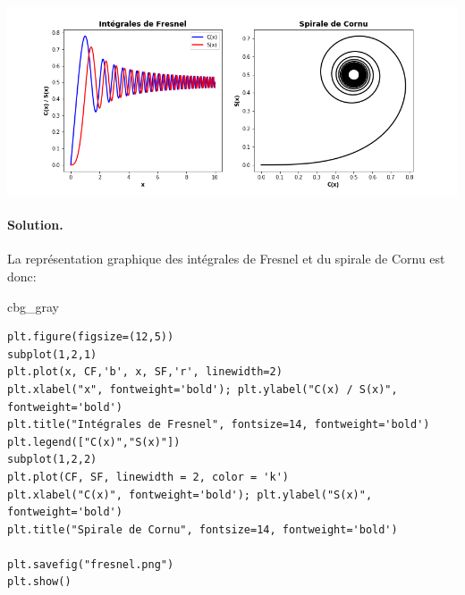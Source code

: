 \documentclass[%
oneside,                 %
final,                   %
10pt,french]{article}
\newenvironment{_cod_tight}[1]{
   \def\FrameCommand{\colorbox{#1}}
   \FrameRule0.6pt\MakeFramed {\FrameRestore}\vskip3mm}
   {\vskip0mm\endMakeFramed}
\newenvironment{cod}[1]{
\bgroup\rmfamily
\fboxsep=0mm\relax
\begin{_cod_tight}{#1}
\list{}{\parsep=-2mm\parskip=0mm\topsep=0pt\leftmargin=2mm
\rightmargin=2\leftmargin\leftmargin=4pt\relax}
\item\relax}
{\endlist\end{_cod_tight}\egroup}
\newenvironment{doconceexercise}{}{}
\begin{document}
\begin{doconceexercise}
\centerline{\includegraphics[width=1.0\linewidth]{imgs/fresnel.png}}

\vspace{6mm}




\paragraph{Solution.}
La représentation graphique des intégrales de Fresnel et du spirale de Cornu est donc:
\begin{cod}{cbg_gray}\begin{verbatim}
plt.figure(figsize=(12,5))
subplot(1,2,1)
plt.plot(x, CF,'b', x, SF,'r', linewidth=2)
plt.xlabel("x", fontweight='bold'); plt.ylabel("C(x) / S(x)", fontweight='bold')
plt.title("Intégrales de Fresnel", fontsize=14, fontweight='bold')
plt.legend(["C(x)","S(x)"])
subplot(1,2,2)
plt.plot(CF, SF, linewidth = 2, color = 'k')
plt.xlabel("C(x)", fontweight='bold'); plt.ylabel("S(x)", fontweight='bold')
plt.title("Spirale de Cornu", fontsize=14, fontweight='bold')

plt.savefig("fresnel.png")
plt.show()
\end{verbatim}
\end{cod}
\noindent


\end{doconceexercise}



\end{document}
